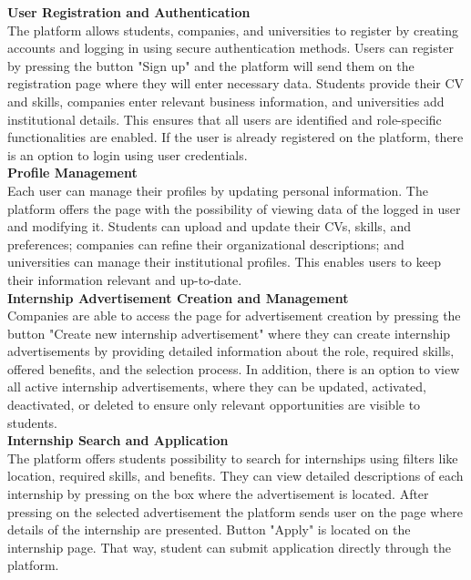 \textbf{User Registration and Authentication} \\
The platform allows students, companies, and universities to register by creating accounts and logging in using secure authentication methods. Users can register by pressing the button "Sign up" and the platform will send them on the registration page where they will enter necessary data. Students provide their CV and skills, companies enter relevant business information, and universities add institutional details. This ensures that all users are identified and role-specific functionalities are enabled. If the user is already registered on the platform, there is an option to login using user credentials. \\

\textbf{Profile Management} \\
Each user can manage their profiles by updating personal information. The platform offers the page with the possibility of viewing data of the logged in user and modifying it. Students can upload and update their CVs, skills, and preferences; companies can refine their organizational descriptions; and universities can manage their institutional profiles. This enables users to keep their information relevant and up-to-date. \\

\textbf{Internship Advertisement Creation and Management} \\
Companies are able to access the page for advertisement creation by pressing the button "Create new internship advertisement" where they can create internship advertisements by providing detailed information about the role, required skills, offered benefits, and the selection process. In addition, there is an option to view all active internship advertisements, where they can be updated, activated, deactivated, or deleted to ensure only relevant opportunities are visible to students. \\

\textbf{Internship Search and Application} \\
The platform offers students possibility to search for internships using filters like location, required skills, and benefits. They can view detailed descriptions of each internship by pressing on the box where the advertisement is located. After pressing on the selected advertisement the platform sends user on the page where details of the internship are presented. Button "Apply" is located on the internship page. That way, student can submit application directly through the platform. \\

